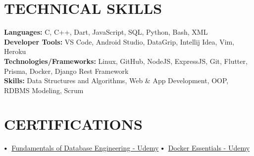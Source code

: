\documentclass[letterpaper,11pt]{article}
\makeatletter
\newcommand{\resumeItem}[1]{
  \item\small{
    {#1 \vspace{-2pt}}
  }
}
\newcommand{\resumeSubheading}[4]{
  \vspace{-2pt}\item
    \begin{tabular*}{1.0\textwidth}[t]{l@{\extracolsep{\fill}}r}
      \textbf{\large#1} & \textbf{\small #2} \\
      \textit{\large#3} & \textit{\small #4} \\
      
    \end{tabular*}\vspace{-7pt}
}
\newcommand{\resumeSubHeadingListStart}{\begin{itemize}[leftmargin=0.0in, label={}]}
\newcommand{\resumeSubHeadingListEnd}{\end{itemize}}
\newcommand{\resumeItemListStart}{\begin{itemize}}
\newcommand{\resumeItemListEnd}{\end{itemize}\vspace{-5pt}}
\newcommand\sbullet[1][.5]{\mathbin{\vcenter{\hbox{\scalebox{#1}{$\bullet$}}}}}
\makeatother
\begin{document}
%


\section{TECHNICAL SKILLS}
 \begin{itemize}[leftmargin=0.15in, label={}]
    \small{\item{
     \textbf{\normalsize{Languages:}}{ \normalsize{C, C++, Dart, JavaScript, SQL, Python, Bash, XML}} \\
     \textbf{\normalsize{Developer Tools:}}{ \normalsize{VS Code, Android Studio, DataGrip, Intellij Idea, Vim, Heroku}} \\
     \textbf{\normalsize{Technologies/Frameworks:}}{\normalsize{ Linux, GitHub, NodeJS, ExpressJS, Git, Flutter, Prisma, Docker, Django Rest Framework}} \\
     \textbf{\normalsize{Skills:}}{ \normalsize{Data Structures and Algorithms, Web \& App Development, OOP, RDBMS Modeling, Scrum}} \\
    }}
 \end{itemize}
 \vspace{-15pt}


 
\section{CERTIFICATIONS}

$\sbullet[.75] \hspace{0.1cm}$ {\href{certificateLink.com}{Fundamentals of Database Engineering - Udemy}} \hspace{1.6cm}
$\sbullet[.75] \hspace{0.2cm}${\href{certificateLink.com} {Docker Essentials - Udemy}}\\
\end{document}
